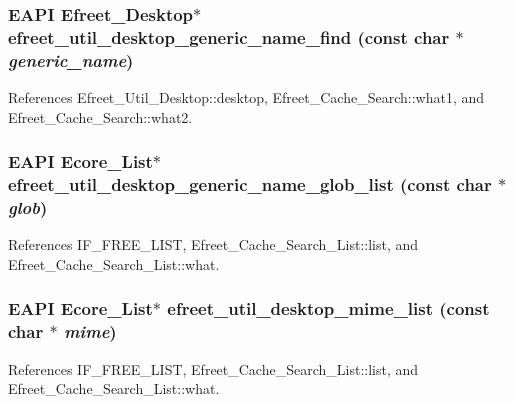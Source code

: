 \subsubsection[efreet\_\-util\_\-desktop\_\-generic\_\-name\_\-find]{\setlength{\rightskip}{0pt plus 5cm}EAPI {\bf Efreet\_\-Desktop}$\ast$ efreet\_\-util\_\-desktop\_\-generic\_\-name\_\-find (const char $\ast$ {\em generic\_\-name})}\label{efreet__utils_8h_3600f55c83919cf98aeb48dea4c3c571}




References Efreet\_\-Util\_\-Desktop::desktop, Efreet\_\-Cache\_\-Search::what1, and Efreet\_\-Cache\_\-Search::what2.
\subsubsection[efreet\_\-util\_\-desktop\_\-generic\_\-name\_\-glob\_\-list]{\setlength{\rightskip}{0pt plus 5cm}EAPI Ecore\_\-List$\ast$ efreet\_\-util\_\-desktop\_\-generic\_\-name\_\-glob\_\-list (const char $\ast$ {\em glob})}\label{efreet__utils_8h_212202181fd841447e81a6ba4fbd567d}




References IF\_\-FREE\_\-LIST, Efreet\_\-Cache\_\-Search\_\-List::list, and Efreet\_\-Cache\_\-Search\_\-List::what.
\subsubsection[efreet\_\-util\_\-desktop\_\-mime\_\-list]{\setlength{\rightskip}{0pt plus 5cm}EAPI Ecore\_\-List$\ast$ efreet\_\-util\_\-desktop\_\-mime\_\-list (const char $\ast$ {\em mime})}\label{efreet__utils_8h_182eda986577cbf4b56b32dfe7ed6579}




References IF\_\-FREE\_\-LIST, Efreet\_\-Cache\_\-Search\_\-List::list, and Efreet\_\-Cache\_\-Search\_\-List::what.
